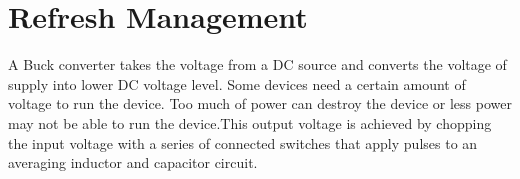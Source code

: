 \section{Refresh Management}
\hspace{10mm}A Buck converter takes the voltage from a DC source and converts the voltage of supply into lower DC voltage level. Some devices need a certain amount of voltage to run the device. Too much of power can destroy the device or less power may not be able to run the device.This output voltage is achieved by chopping the input voltage with a series of connected switches that apply pulses to an averaging inductor and capacitor circuit.


